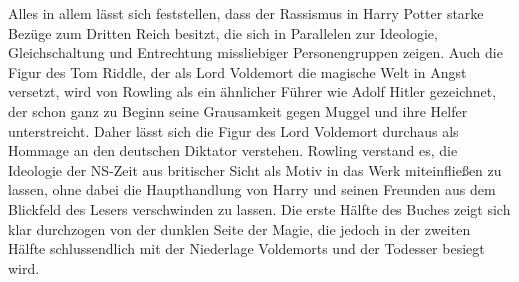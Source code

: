 Alles in allem lässt sich feststellen, dass der Rassismus in \glqq Harry Potter\grqq{} starke Bezüge zum Dritten Reich besitzt, die sich in Parallelen zur Ideologie, Gleichschaltung und Entrechtung missliebiger Personengruppen zeigen.
Auch die Figur des Tom Riddle, der als Lord Voldemort die magische Welt in Angst versetzt, wird von Rowling als ein ähnlicher \glqq Führer\grqq{} wie Adolf Hitler gezeichnet, der schon ganz zu Beginn seine Grausamkeit gegen Muggel und ihre Helfer unterstreicht.
Daher lässt sich die Figur des Lord Voldemort durchaus als Hommage an den deutschen Diktator verstehen.
Rowling verstand es, die Ideologie der NS-Zeit aus britischer Sicht als Motiv in das Werk miteinfließen zu lassen, ohne dabei die Haupthandlung von Harry und seinen Freunden aus dem Blickfeld des Lesers verschwinden zu lassen. 
Die erste Hälfte des Buches zeigt sich klar durchzogen von der dunklen Seite der Magie, die jedoch in der zweiten Hälfte schlussendlich mit der Niederlage Voldemorts und der Todesser besiegt wird.
